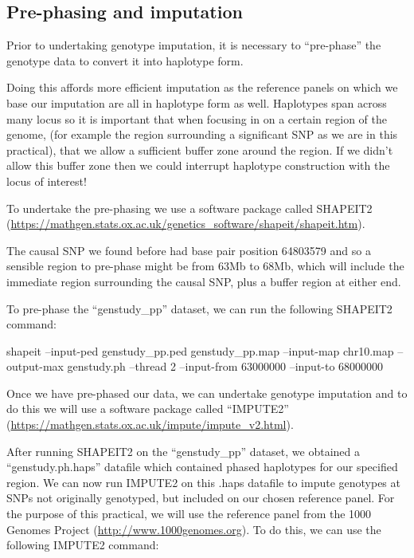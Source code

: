 \documentclass[]{book}
\newenvironment{Shaded}{\begin{snugshade}}{\end{snugshade}}
\newcommand{\ExtensionTok}[1]{#1}
\newcommand{\NormalTok}[1]{#1}
\begin{document}
\subsection{Pre-phasing and
imputation}\label{pre-phasing-and-imputation}

Prior to undertaking genotype imputation, it is necessary to
``pre-phase'' the genotype data to convert it into haplotype form.

Doing this affords more efficient imputation as the reference panels on
which we base our imputation are all in haplotype form as well.
Haplotypes span across many locus so it is important that when focusing
in on a certain region of the genome, (for example the region
surrounding a significant SNP as we are in this practical), that we
allow a sufficient buffer zone around the region. If we didn't allow
this buffer zone then we could interrupt haplotype construction with the
locus of interest!

To undertake the pre-phasing we use a software package called SHAPEIT2
(\url{https://mathgen.stats.ox.ac.uk/genetics_software/shapeit/shapeit.htm}).

The causal SNP we found before had base pair position 64803579 and so a
sensible region to pre-phase might be from 63Mb to 68Mb, which will
include the immediate region surrounding the causal SNP, plus a buffer
region at either end.

To pre-phase the ``genstudy\_pp'' dataset, we can run the following
SHAPEIT2 command:

\begin{Shaded}
\begin{Highlighting}[]
\ExtensionTok{shapeit}\NormalTok{ --input-ped genstudy_pp.ped genstudy_pp.map --input-map chr10.map --output-max genstudy.ph --thread 2 --input-from 63000000 --input-to 68000000}
\end{Highlighting}
\end{Shaded}

Once we have pre-phased our data, we can undertake genotype imputation
and to do this we will use a software package called ``IMPUTE2''
(\url{https://mathgen.stats.ox.ac.uk/impute/impute_v2.html}).

After running SHAPEIT2 on the ``genstudy\_pp'' dataset, we obtained a
``genstudy.ph.haps'' datafile which contained phased haplotypes for our
specified region. We can now run IMPUTE2 on this .haps datafile to
impute genotypes at SNPs not originally genotyped, but included on our
chosen reference panel. For the purpose of this practical, we will use
the reference panel from the 1000 Genomes Project
(\url{http://www.1000genomes.org}). To do this, we can use the following
IMPUTE2 command:
\end{document}
